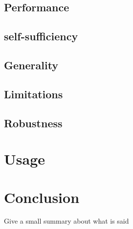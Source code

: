 \documentclass{article}
\begin{document}
\subsection{Performance}
\subsection{self-sufficiency}
\subsection{Generality}

\subsection{Limitations}
\subsection{Robustness}

\section{Usage}

\section{Conclusion}
Give a small summary about what is said
\end{document}
